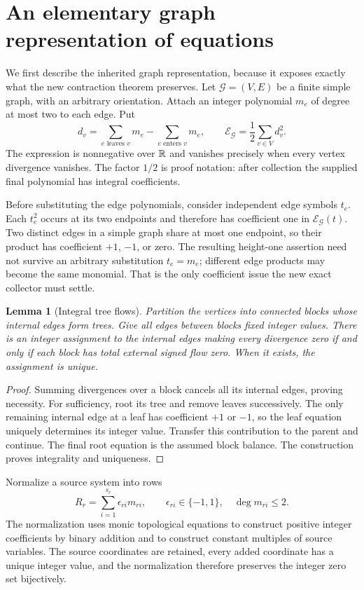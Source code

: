 \documentclass[11pt,letterpaper]{article}
\newtheorem{lemma}[theorem]{Lemma}
\theoremstyle{definition}\newtheorem{definition}[theorem]{Definition}
\theoremstyle{remark}\newtheorem{remark}[theorem]{Remark}
\begin{document}
\section{An elementary graph representation of equations}
\label{sec:graph}

We first describe the inherited graph representation, because it exposes
exactly what the new contraction theorem preserves. Let $\mathcal G=(V,E)$
be a finite simple graph, with an arbitrary orientation. Attach an integer
polynomial $m_e$ of degree at most two to each edge. Put
\[
 d_v=\sum_{e\text{ leaves }v}m_e-\sum_{e\text{ enters }v}m_e,
 \qquad \mathcal E_{\mathcal G}=\frac12\sum_{v\in V}d_v^2.
\]
The expression is nonnegative over $\mathbb R$ and vanishes precisely when every
vertex divergence vanishes. The factor $1/2$ is proof notation: after
collection the supplied final polynomial has integral coefficients.

Before substituting the edge polynomials, consider independent edge symbols
$t_e$. Each $t_e^2$ occurs at its two endpoints and therefore has coefficient
one in $\mathcal E_{\mathcal G}(t)$. Two distinct edges in a simple graph
share at most one endpoint, so their product has coefficient $+1$, $-1$, or
zero. The resulting height-one assertion need not survive an arbitrary
substitution $t_e=m_e$; different edge products may become the same
monomial. That is the only coefficient issue the new exact collector must
settle.

\begin{lemma}[Integral tree flows]\label{lem:tree}
Partition the vertices into connected blocks whose internal edges form
trees. Give all edges between blocks fixed integer values. There is an
integer assignment to the internal edges making every divergence zero if
and only if each block has total external signed flow zero. When it exists,
the assignment is unique.
\end{lemma}
\begin{proof}
Summing divergences over a block cancels all its internal edges, proving
necessity. For sufficiency, root its tree and remove leaves successively.
The only remaining internal edge at a leaf has coefficient $+1$ or $-1$,
so the leaf equation uniquely determines its integer value. Transfer this
contribution to the parent and continue. The final root equation is the
assumed block balance. The construction proves integrality and uniqueness.
\end{proof}

Normalize a source system into rows
\[
 R_r=\sum_{i=1}^{s_r}\epsilon_{ri}m_{ri},\qquad
       \epsilon_{ri}\in\{-1,1\},\quad\deg m_{ri}\leq2.
\]
The normalization uses monic topological equations to construct positive
integer coefficients by binary addition and to construct constant multiples
of source variables. The source coordinates are retained, every added
coordinate has a unique integer value, and the normalization therefore
preserves the integer zero set bijectively.
\end{document}

